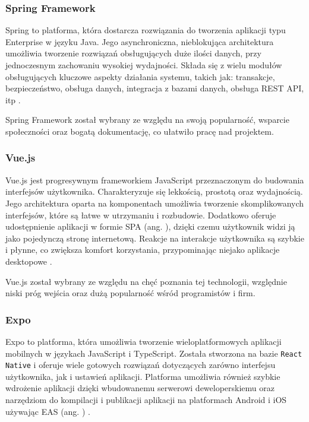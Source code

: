 \subsubsection*{Spring Framework}

Spring to platforma, która dostarcza rozwiązania do tworzenia aplikacji typu Enterprise w języku Java. Jego asynchroniczna, nieblokująca architektura umożliwia tworzenie rozwiązań obsługujących duże ilości danych, przy jednoczesnym zachowaniu wysokiej wydajności. Składa się z wielu modułów obsługujących kluczowe aspekty działania systemu, takich jak: transakcje, bezpieczeństwo, obsługa danych, integracja z bazami danych, obsługa REST API, itp \cite{bib:spring}.

Spring Framework został wybrany ze względu na swoją popularność, wsparcie społeczności oraz bogatą dokumentację, co ułatwiło pracę nad projektem.

\subsubsection*{Vue.js}

Vue.js jest progresywnym frameworkiem JavaScript przeznaczonym do budowania interfejsów użytkownika. Charakteryzuje się lekkością, prostotą oraz wydajnością. Jego architektura oparta na komponentach umożliwia tworzenie skomplikowanych interfejsów, które są łatwe w utrzymaniu i rozbudowie. Dodatkowo oferuje udostępnienie aplikacji w formie SPA (ang. ), dzięki czemu użytkownik widzi ją jako pojedynczą stronę internetową. Reakcje na interakcje użytkownika są szybkie i płynne, co zwiększa komfort korzystania, przypominając niejako aplikacje desktopowe \cite{bib:vuejs}.

Vue.js został wybrany ze względu na chęć poznania tej technologii, względnie niski próg wejścia oraz dużą popularność wśród programistów i firm.

\subsubsection*{Expo}

Expo to platforma, która umożliwia tworzenie wieloplatformowych aplikacji mobilnych w językach JavaScript i TypeScript. Została stworzona na bazie \texttt{React Native} i oferuje wiele gotowych rozwiązań dotyczących zarówno interfejsu użytkownika, jak i ustawień aplikacji. Platforma umożliwia również szybkie wdrożenie aplikacji dzięki wbudowanemu serwerowi deweloperskiemu oraz narzędziom do kompilacji i publikacji aplikacji na platformach Android i iOS używając EAS (ang. ) \cite{bib:expo}.


